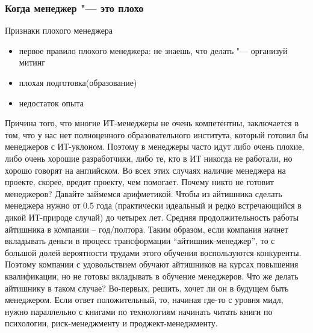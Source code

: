 \documentclass{../industrial-development}
\begin{document}
\begin{frame} \frametitle{Когда менеджер "--- это плохо}
	\begin{block}{Признаки плохого менеджера}
	 \begin{itemize}
	 	\item первое правило плохого менеджера: не знаешь, что делать "--- организуй митинг
	 	\item плохая подготовка(образование)
	 	\item недостаток опыта
	 \end{itemize}
 	\end{block}
\end{frame}
\lecturenotes
Причина того, что многие ИТ-менеджеры не очень компетентны, заключается в том, что у нас нет полноценного образовательного института, который готовил бы менеджеров с ИТ-уклоном. Поэтому в менеджеры часто идут либо очень плохие, либо очень хорошие разработчики, либо те, кто в ИТ никогда не работали, но хорошо говорят на английском. Во всех этих случаях наличие менеджера на проекте, скорее, вредит проекту, чем помогает. 
Почему никто не готовит менеджеров? Давайте займемся арифметикой. Чтобы из айтишника сделать менеджера нужно от 0.5 года (практически идеальный и редко встречающийся в дикой ИТ-природе случай) до четырех лет. Средняя продолжительность работы айтишника в компании – год/полтора. Таким образом, если компания начнет вкладывать деньги в процесс трансформации “айтишник-менеджер”, то с большой долей вероятности трудами этого обучения воспользуются конкуренты. Поэтому компании с удовольствием обучают айтишников на курсах повышения квалификации, но не готовы вкладывать в обучение менеджеров.
Что же делать айтишнику в таком случае? Во-первых, решить, хочет ли он в будущем быть менеджером. Если ответ положительный, то, начиная где-то с уровня мидл, нужно параллельно с книгами по технологиям начинать читать книги по психологии, риск-менеджменту и проджект-менеджменту. 
~\cite{Managers_in_IT}
\end{document}
